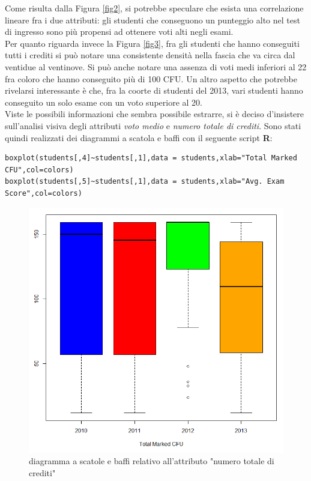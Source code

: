            Come risulta dalla Figura \ref{fig2}, si potrebbe speculare che esista una correlazione lineare fra i due attributi: gli studenti che conseguono un punteggio alto nel test di ingresso sono più propensi ad ottenere voti alti negli esami. \\

            Per quanto riguarda invece la Figura \ref{fig3}, fra gli studenti che hanno conseguiti tutti i crediti si può notare una consistente densità nella fascia che va circa dal ventidue al ventinove. Si può anche notare una assenza di voti medi inferiori al 22 fra coloro che hanno conseguito più di 100 CFU. Un altro aspetto che potrebbe rivelarsi interessante è che, fra la coorte di studenti del 2013, vari studenti hanno conseguito un solo esame con un voto superiore al 20. \\

            Viste le possibili informazioni che sembra possibile estrarre, si è deciso d'insistere sull’analisi visiva degli attributi \textit{voto medio} e \textit{numero totale di crediti}. Sono stati quindi realizzati dei diagrammi a scatola e baffi con il seguente script \textbf{R}: 

            \begin{lstlisting}
boxplot(students[,4]~students[,1],data = students,xlab="Total Marked CFU",col=colors)
boxplot(students[,5]~students[,1],data = students,xlab="Avg. Exam Score",col=colors)
            \end{lstlisting}

            \begin{figure}
                \centering
                \caption{diagramma a scatole e baffi relativo all'attributo "numero totale di crediti"}
                \label{boxplot1}
            	\includegraphics[scale=0.55]{img/box_plot_1.png}
            \end{figure}

